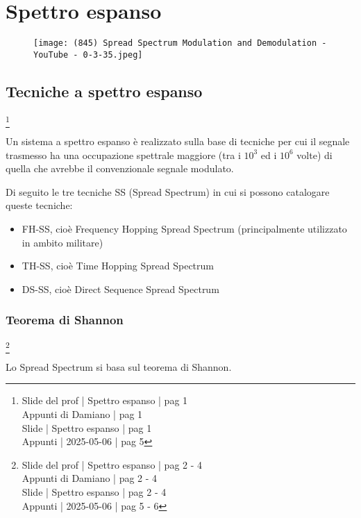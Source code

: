 \chapter{Spettro espanso}

\begin{figure}[h]
    \centering
    \texttt{[image: (845) Spread Spectrum Modulation and Demodulation - YouTube - 0-3-35.jpeg]}
\end{figure}

\newpage 

\section{Tecniche a spettro espanso}
\footnote{Slide del prof | Spettro espanso | pag 1 \\
Appunti di Damiano | pag 1 \\ 
Slide | Spettro espanso | pag 1 \\
Appunti | 2025-05-06 | pag 5
} 


Un sistema a spettro espanso è realizzato sulla base di tecniche per cui il segnale trasmesso ha una occupazione spettrale 
maggiore (tra i $10^{3}$ ed i $10^{6}$ volte) di quella che avrebbe il convenzionale segnale modulato. \newline 

Di seguito le tre tecniche SS (Spread Spectrum) in cui si possono catalogare queste tecniche: 

\begin{itemize}
    \item FH-SS, cioè Frequency Hopping Spread Spectrum (principalmente utilizzato in ambito militare) 
    \item TH-SS, cioè Time Hopping Spread Spectrum 
    \item DS-SS, cioè Direct Sequence Spread Spectrum 
\end{itemize}

\newpage 

\subsection{Teorema di Shannon}
\footnote{Slide del prof | Spettro espanso | pag 2 - 4\\
Appunti di Damiano | pag 2 - 4\\ 
Slide | Spettro espanso | pag 2 - 4\\
Appunti | 2025-05-06 | pag 5 - 6
} 

Lo Spread Spectrum si basa sul teorema di Shannon. \newline 

